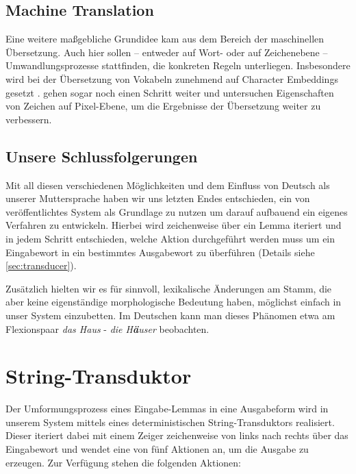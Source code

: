\documentclass[11pt,a4paper]{article}
\begin{document}
\subsection{Machine Translation}
Eine weitere maßgebliche Grundidee kam aus dem Bereich der maschinellen Übersetzung. Auch hier sollen -- entweder auf Wort- oder auf Zeichenebene -- Umwandlungsprozesse stattfinden, die konkreten Regeln unterliegen.
Insbesondere wird bei der Übersetzung von Vokabeln zunehmend auf Character Embeddings gesetzt \citep{charMT1, charMT2, charMT3, charMT4, charMT5}.
\citet{cjk-mt:LiuLLN17} gehen sogar noch einen Schritt weiter und untersuchen Eigenschaften von Zeichen auf Pixel-Ebene, um die Ergebnisse der Übersetzung weiter zu verbessern.

\subsection{Unsere Schlussfolgerungen}
Mit all diesen verschiedenen Möglichkeiten und dem Einfluss von Deutsch als unserer Muttersprache haben wir uns letzten Endes entschieden, ein von \citet{cluzh:MakarovRC17} veröffentlichtes System als Grundlage zu nutzen um darauf aufbauend ein eigenes Verfahren zu entwickeln.
Hierbei wird zeichenweise über ein Lemma iteriert und in jedem Schritt entschieden, welche Aktion durchgeführt werden muss um ein Eingabewort in ein bestimmtes Ausgabewort zu überführen (Details siehe \autoref{sec:transducer}).

Zusätzlich hielten wir es für sinnvoll, lexikalische Änderungen am Stamm, die aber keine eigenständige morphologische Bedeutung haben, möglichst einfach in unser System einzubetten.
Im Deutschen kann man dieses Phänomen etwa am Flexionspaar \textit{das Haus} - \textit{die H\textbf{ä}user} beobachten.

\section{String-Transduktor}
\label{sec:transducer}

Der Umformungsprozess eines Eingabe-Lemmas in eine Ausgabeform wird in unserem System mittels eines deterministischen String-Transduktors realisiert. Dieser iteriert dabei mit einem Zeiger zeichenweise von links nach rechts über das Eingabewort und wendet eine von fünf Aktionen an, um die Ausgabe zu erzeugen. Zur Verfügung stehen die folgenden Aktionen:
\end{document}

